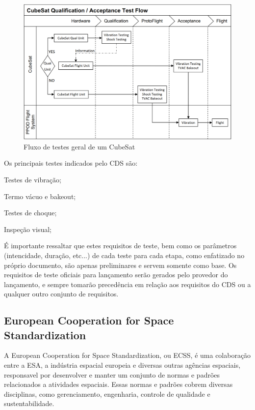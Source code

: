 \begin{figure}[htp]
    \caption{Fluxo de testes geral de um CubeSat}
    \begin{center}
        \includegraphics[width=\textwidth, keepaspectratio]{images/test-flow-diagram-cds.png}
    \end{center}
    \label{fig:test-flow-cds}
\end{figure}

Os principais testes indicados pelo \gls{CDS} são:
\begin{alineas}
    \item Testes de vibração;
    \item Termo vácuo e bakeout;
    \item Testes de choque;
    \item Inspeção visual;
\end{alineas}

É importante ressaltar que estes requisitos de teste, bem como os parâmetros (intencidade, duração, etc...) de cada teste para cada etapa, como enfatizado no próprio documento, são apenas preliminares e servem somente como base. Os requisitos de teste oficiais para lançamento serão gerados pelo provedor do lançamento, e sempre tomarão precedência em relação aos requisitos do \gls{CDS} ou a qualquer outro conjunto de requisitos.


\subsection{European Cooperation for Space Standardization}

A European Cooperation for Space Standardization, ou \gls{ECSS}, é uma colaboração entre a \gls{ESA}, a indústria espacial europeia e diversas outras agências espaciais, responsavel por desenvolver e manter um conjunto de normas e padrões relacionados a atividades espaciais. Essas normas e padrões cobrem diversas disciplinas, como gerenciamento, engenharia, controle de qualidade e sustentabilidade.

